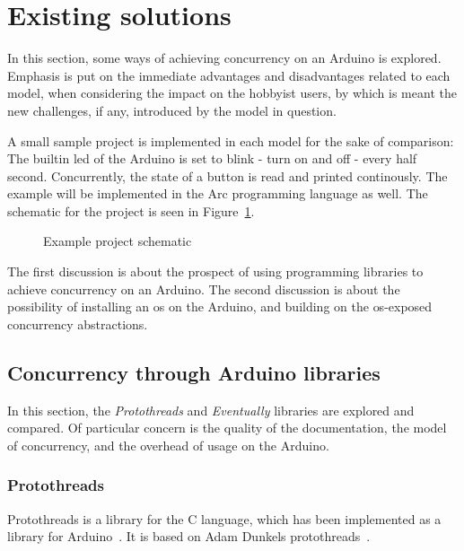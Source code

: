 \section{Existing solutions}\label{sec:existingsolutions}
In this section, some ways of achieving concurrency on an Arduino is explored. Emphasis is put on the immediate advantages and disadvantages related to each model, when considering the impact on the hobbyist users, by which is meant the new challenges, if any, introduced by the model in question.

A small sample project is implemented in each model for the sake of comparison: The builtin \gls{led} of the Arduino is set to blink - turn on and off - every half second. Concurrently, the state of a button is read and printed continously. The example will be implemented in the Arc programming language as well. The schematic for the project is seen in Figure~\ref{fig:exampleprojectschematic}.


\begin{figure}[htb!]
  \centering
  \caption{Example project schematic}
  \label{fig:exampleprojectschematic}
\end{figure}


The first discussion is about the prospect of using programming libraries to achieve concurrency on an Arduino. The second discussion is about the possibility of installing an \gls{os} on the Arduino, and building on the \gls{os}-exposed concurrency abstractions.

\subsection{Concurrency through Arduino libraries}\label{subsec:arduinolibraries}
In this section, the \textit{Protothreads} and \textit{Eventually} libraries are explored and compared. Of particular concern is the quality of the documentation, the model of concurrency, and the overhead of usage on the Arduino.

\subsubsection{Protothreads}
Protothreads is a library for the C language, which has been implemented as a library for Arduino~\cite{Artin2020}. It is based on Adam Dunkels protothreads~\cite{AdamDunkelProtothreads}.


